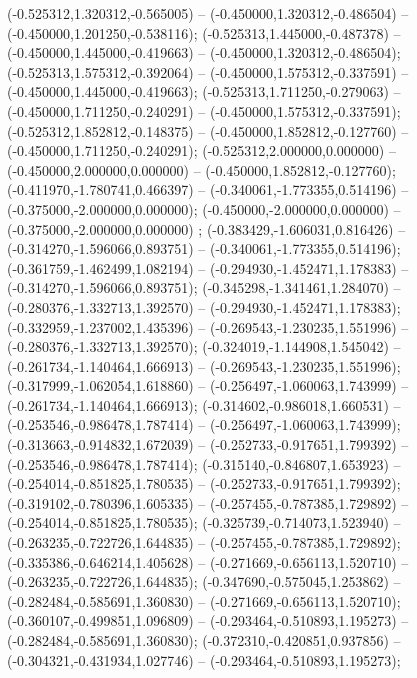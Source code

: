  (-0.525312,1.320312,-0.565005) -- (-0.450000,1.320312,-0.486504) -- (-0.450000,1.201250,-0.538116);
 (-0.525313,1.445000,-0.487378) -- (-0.450000,1.445000,-0.419663) -- (-0.450000,1.320312,-0.486504);
 (-0.525313,1.575312,-0.392064) -- (-0.450000,1.575312,-0.337591) -- (-0.450000,1.445000,-0.419663);
 (-0.525313,1.711250,-0.279063) -- (-0.450000,1.711250,-0.240291) -- (-0.450000,1.575312,-0.337591);
 (-0.525312,1.852812,-0.148375) -- (-0.450000,1.852812,-0.127760) -- (-0.450000,1.711250,-0.240291);
 (-0.525312,2.000000,0.000000) -- (-0.450000,2.000000,0.000000) -- (-0.450000,1.852812,-0.127760);
 (-0.411970,-1.780741,0.466397) -- (-0.340061,-1.773355,0.514196) -- (-0.375000,-2.000000,0.000000);
 (-0.450000,-2.000000,0.000000) -- (-0.375000,-2.000000,0.000000) ;
 (-0.383429,-1.606031,0.816426) -- (-0.314270,-1.596066,0.893751) -- (-0.340061,-1.773355,0.514196);
 (-0.361759,-1.462499,1.082194) -- (-0.294930,-1.452471,1.178383) -- (-0.314270,-1.596066,0.893751);
 (-0.345298,-1.341461,1.284070) -- (-0.280376,-1.332713,1.392570) -- (-0.294930,-1.452471,1.178383);
 (-0.332959,-1.237002,1.435396) -- (-0.269543,-1.230235,1.551996) -- (-0.280376,-1.332713,1.392570);
 (-0.324019,-1.144908,1.545042) -- (-0.261734,-1.140464,1.666913) -- (-0.269543,-1.230235,1.551996);
 (-0.317999,-1.062054,1.618860) -- (-0.256497,-1.060063,1.743999) -- (-0.261734,-1.140464,1.666913);
 (-0.314602,-0.986018,1.660531) -- (-0.253546,-0.986478,1.787414) -- (-0.256497,-1.060063,1.743999);
 (-0.313663,-0.914832,1.672039) -- (-0.252733,-0.917651,1.799392) -- (-0.253546,-0.986478,1.787414);
 (-0.315140,-0.846807,1.653923) -- (-0.254014,-0.851825,1.780535) -- (-0.252733,-0.917651,1.799392);
 (-0.319102,-0.780396,1.605335) -- (-0.257455,-0.787385,1.729892) -- (-0.254014,-0.851825,1.780535);
 (-0.325739,-0.714073,1.523940) -- (-0.263235,-0.722726,1.644835) -- (-0.257455,-0.787385,1.729892);
 (-0.335386,-0.646214,1.405628) -- (-0.271669,-0.656113,1.520710) -- (-0.263235,-0.722726,1.644835);
 (-0.347690,-0.575045,1.253862) -- (-0.282484,-0.585691,1.360830) -- (-0.271669,-0.656113,1.520710);
 (-0.360107,-0.499851,1.096809) -- (-0.293464,-0.510893,1.195273) -- (-0.282484,-0.585691,1.360830);
 (-0.372310,-0.420851,0.937856) -- (-0.304321,-0.431934,1.027746) -- (-0.293464,-0.510893,1.195273);
